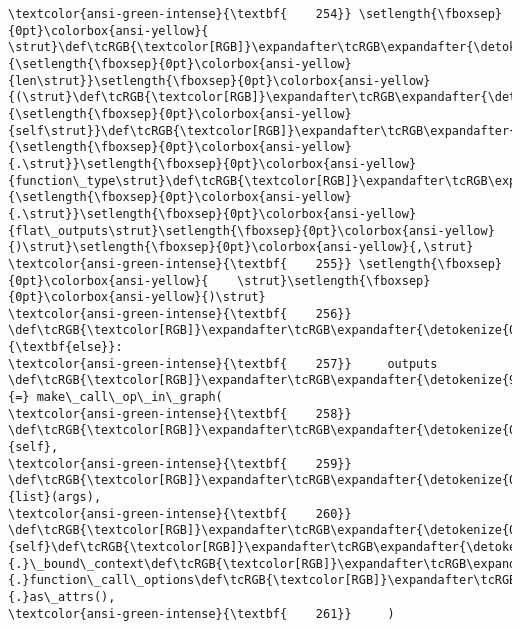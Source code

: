 \documentclass[11pt]{article}
\begin{document}
\begin{Verbatim}[commandchars=\\\{\}, frame=single, framerule=2mm, rulecolor=\color{outerrorbackground}]
\textcolor{ansi-green-intense}{\textbf{    254}} \setlength{\fboxsep}{0pt}\colorbox{ansi-yellow}{        \strut}\def\tcRGB{\textcolor[RGB]}\expandafter\tcRGB\expandafter{\detokenize{0,135,0}}{\setlength{\fboxsep}{0pt}\colorbox{ansi-yellow}{len\strut}}\setlength{\fboxsep}{0pt}\colorbox{ansi-yellow}{(\strut}\def\tcRGB{\textcolor[RGB]}\expandafter\tcRGB\expandafter{\detokenize{0,135,0}}{\setlength{\fboxsep}{0pt}\colorbox{ansi-yellow}{self\strut}}\def\tcRGB{\textcolor[RGB]}\expandafter\tcRGB\expandafter{\detokenize{98,98,98}}{\setlength{\fboxsep}{0pt}\colorbox{ansi-yellow}{.\strut}}\setlength{\fboxsep}{0pt}\colorbox{ansi-yellow}{function\_type\strut}\def\tcRGB{\textcolor[RGB]}\expandafter\tcRGB\expandafter{\detokenize{98,98,98}}{\setlength{\fboxsep}{0pt}\colorbox{ansi-yellow}{.\strut}}\setlength{\fboxsep}{0pt}\colorbox{ansi-yellow}{flat\_outputs\strut}\setlength{\fboxsep}{0pt}\colorbox{ansi-yellow}{)\strut}\setlength{\fboxsep}{0pt}\colorbox{ansi-yellow}{,\strut}
\textcolor{ansi-green-intense}{\textbf{    255}} \setlength{\fboxsep}{0pt}\colorbox{ansi-yellow}{    \strut}\setlength{\fboxsep}{0pt}\colorbox{ansi-yellow}{)\strut}
\textcolor{ansi-green-intense}{\textbf{    256}}   \def\tcRGB{\textcolor[RGB]}\expandafter\tcRGB\expandafter{\detokenize{0,135,0}}{\textbf{else}}:
\textcolor{ansi-green-intense}{\textbf{    257}}     outputs \def\tcRGB{\textcolor[RGB]}\expandafter\tcRGB\expandafter{\detokenize{98,98,98}}{=} make\_call\_op\_in\_graph(
\textcolor{ansi-green-intense}{\textbf{    258}}         \def\tcRGB{\textcolor[RGB]}\expandafter\tcRGB\expandafter{\detokenize{0,135,0}}{self},
\textcolor{ansi-green-intense}{\textbf{    259}}         \def\tcRGB{\textcolor[RGB]}\expandafter\tcRGB\expandafter{\detokenize{0,135,0}}{list}(args),
\textcolor{ansi-green-intense}{\textbf{    260}}         \def\tcRGB{\textcolor[RGB]}\expandafter\tcRGB\expandafter{\detokenize{0,135,0}}{self}\def\tcRGB{\textcolor[RGB]}\expandafter\tcRGB\expandafter{\detokenize{98,98,98}}{.}\_bound\_context\def\tcRGB{\textcolor[RGB]}\expandafter\tcRGB\expandafter{\detokenize{98,98,98}}{.}function\_call\_options\def\tcRGB{\textcolor[RGB]}\expandafter\tcRGB\expandafter{\detokenize{98,98,98}}{.}as\_attrs(),
\textcolor{ansi-green-intense}{\textbf{    261}}     )


\end{Verbatim}
\end{document}

